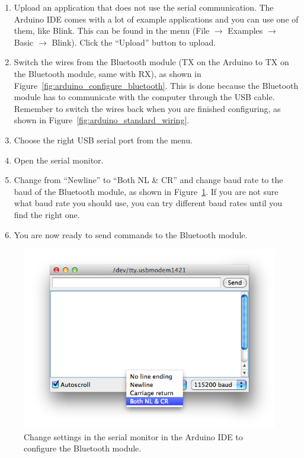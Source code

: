 		\begin{enumerate}
		\item Upload an application that does not use the serial communication. The Arduino IDE comes with a lot of example applications and you can use one of them, like Blink. This can be found in the menu (File $\rightarrow$ Examples $\rightarrow$ Basic $\rightarrow$ Blink). Click the ``Upload'' button to upload.
		
		\item Switch the wires from the Bluetooth module (TX on the Arduino to TX on the Bluetooth module, same with RX), as shown in Figure~\ref{fig:arduino_configure_bluetooth}. This is done because the Bluetooth module has to communicate with the computer through the USB cable. Remember to switch the wires back when you are finished configuring, as shown in Figure~\ref{fig:arduino_standard_wiring}.
		
		\item Choose the right USB serial port from the menu.
		
		\item Open the serial monitor.
		
		\item Change from ``Newline'' to ``Both NL \& CR'' and change baud rate to the baud of the Bluetooth module, as shown in Figure~\ref{fig:serial_monitor}. If you are not sure what baud rate you should use, you can try different baud rates until you find the right one.
		
		\item You are now ready to send commands to the Bluetooth module.
		\end{enumerate}
		
		\begin{figure}[H]
			\centering
			\includegraphics[scale=0.5]{images/serial_monitor.png}
			\caption{Change settings in the serial monitor in the Arduino IDE to configure the Bluetooth module.}
			\label{fig:serial_monitor}
		\end{figure}
		

